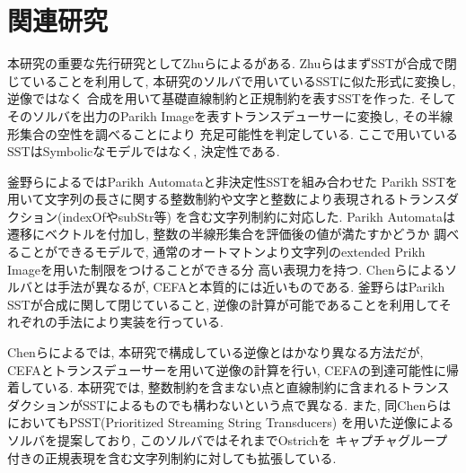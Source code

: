 \documentclass[uplatex,dvipdfmx,a4j]{jsreport}
\begin{document}
  \chapter{関連研究}  \label{chap:related_works}

  本研究の重要な先行研究としてZhuらによる\cite{zhu2019sstsolver}がある.
  ZhuらはまずSSTが合成で閉じていることを利用して, 本研究のソルバで用いているSSTに似た形式に変換し, 逆像ではなく
  合成を用いて基礎直線制約と正規制約を表すSSTを作った.
  そしてそのソルバを出力のParikh Imageを表すトランスデューサーに変換し, その半線形集合の空性を調べることにより
  充足可能性を判定している.
  ここで用いているSSTはSymbolicなモデルではなく, 決定性である.

  釜野らによる\cite{kamano2021solver}ではParikh Automataと非決定性SSTを組み合わせた
  Parikh SSTを用いて文字列の長さに関する整数制約や文字と整数により表現されるトランスダクション(indexOfやsubStr等)
  を含む文字列制約に対応した. Parikh Automataは遷移にベクトルを付加し, 整数の半線形集合を評価後の値が満たすかどうか
  調べることができるモデルで, 通常のオートマトンより文字列のextended Prikh Imageを用いた制限をつけることができる分
  高い表現力を持つ. Chenらによるソルバとは手法が異なるが, CEFAと本質的には近いものである.
  釜野らはParikh SSTが合成に関して閉じていること, 逆像の計算が可能であることを利用してそれぞれの手法により実装を行っている.

  Chenらによる\cite{chen2020decision}では, 本研究で構成している逆像とはかなり異なる方法だが,
  CEFAとトランスデューサーを用いて逆像の計算を行い, CEFAの到達可能性に帰着している.
  本研究では, 整数制約を含まない点と直線制約に含まれるトランスダクションがSSTによるものでも構わないという点で異なる.
  また, 同Chenらは\cite{chen2022solving}においてもPSST(Prioritized Streaming String Transducers)
  を用いた逆像によるソルバを提案しており, このソルバではそれまでOstrichを
  キャプチャグループ付きの正規表現を含む文字列制約に対しても拡張している.
\end{document}
